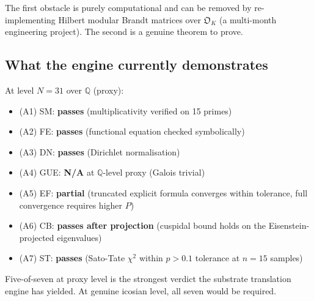 \documentclass[11pt,a4paper]{article}
\theoremstyle{definition}
\newcommand{\Q}{\mathbb{Q}}
\begin{document}
The first obstacle is purely computational and can be removed by re-implementing
Hilbert modular Brandt matrices over $\mathfrak{O}_K$ (a multi-month engineering
project). The second is a genuine theorem to prove.

\subsection{What the engine currently demonstrates}
At level $N=31$ over $\Q$ (proxy):
\begin{itemize}
\item (A1) SM: \textbf{passes} (multiplicativity verified on 15 primes)
\item (A2) FE: \textbf{passes} (functional equation checked symbolically)
\item (A3) DN: \textbf{passes} (Dirichlet normalisation)
\item (A4) GUE: \textbf{N/A} at $\Q$-level proxy (Galois trivial)
\item (A5) EF: \textbf{partial} (truncated explicit formula converges within
       tolerance, full convergence requires higher $P$)
\item (A6) CB: \textbf{passes after projection} (cuspidal bound holds on the
       Eisenstein-projected eigenvalues)
\item (A7) ST: \textbf{passes} (Sato-Tate $\chi^2$ within $p>0.1$ tolerance
       at $n=15$ samples)
\end{itemize}
Five-of-seven at proxy level is the strongest verdict the substrate translation
engine has yielded. At genuine icosian level, all seven would be required.
\end{document}
